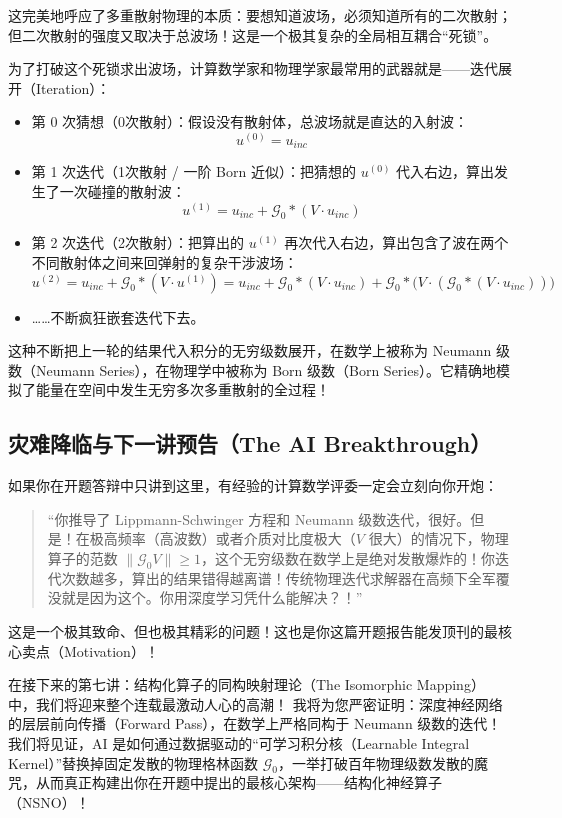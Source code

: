 \documentclass[12pt]{article}
\begin{document}
{这完美地呼应了多重散射物理的本质：要想知道波场，必须知道所有的二次散射；但二次散射的强度又取决于总波场！这是一个极其复杂的全局相互耦合“死锁”。

为了打破这个死锁求出波场，计算数学家和物理学家最常用的武器就是——迭代展开（Iteration）：

\begin{itemize}[leftmargin=2em]
    \item 第 0 次猜想（0次散射）：假设没有散射体，总波场就是直达的入射波：
    \[
    u^{(0)} = u_{inc}
    \]
    \item 第 1 次迭代（1次散射 / 一阶 Born 近似）：把猜想的 $u^{(0)}$ 代入右边，算出发生了一次碰撞的散射波：
    \[
    u^{(1)} = u_{inc} + \mathcal{G}_0 * (V \cdot u_{inc})
    \]
    \item 第 2 次迭代（2次散射）：把算出的 $u^{(1)}$ 再次代入右边，算出包含了波在两个不同散射体之间来回弹射的复杂干涉波场：
    \[
    u^{(2)} = u_{inc} + \mathcal{G}_0 * (V \cdot u^{(1)})
    = u_{inc} + \mathcal{G}_0 * (V \cdot u_{inc}) + \mathcal{G}_0 * \Big(V \cdot (\mathcal{G}_0 * (V \cdot u_{inc}))\Big)
    \]
    \item ……不断疯狂嵌套迭代下去。
\end{itemize}

这种不断把上一轮的结果代入积分的无穷级数展开，在数学上被称为 Neumann 级数（Neumann Series），在物理学中被称为 Born 级数（Born Series）。它精确地模拟了能量在空间中发生无穷多次多重散射的全过程！

\subsection{灾难降临与下一讲预告（The AI Breakthrough）}

如果你在开题答辩中只讲到这里，有经验的计算数学评委一定会立刻向你开炮：

\begin{quote}
“你推导了 Lippmann-Schwinger 方程和 Neumann 级数迭代，很好。但是！在极高频率（高波数）或者介质对比度极大（$V$ 很大）的情况下，物理算子的范数 $\|\mathcal{G}_0 V\| \ge 1$，这个无穷级数在数学上是绝对发散爆炸的！你迭代次数越多，算出的结果错得越离谱！传统物理迭代求解器在高频下全军覆没就是因为这个。你用深度学习凭什么能解决？！”
\end{quote}

这是一个极其致命、但也极其精彩的问题！这也是你这篇开题报告能发顶刊的最核心卖点（Motivation）！

在接下来的第七讲：结构化算子的同构映射理论（The Isomorphic Mapping）中，我们将迎来整个连载最激动人心的高潮！
我将为您严密证明：深度神经网络的层层前向传播（Forward Pass），在数学上严格同构于 Neumann 级数的迭代！
我们将见证，AI 是如何通过数据驱动的“可学习积分核（Learnable Integral Kernel）”替换掉固定发散的物理格林函数 $\mathcal{G}_0$，一举打破百年物理级数发散的魔咒，从而真正构建出你在开题中提出的最核心架构——结构化神经算子（NSNO）！



}
\end{document}
